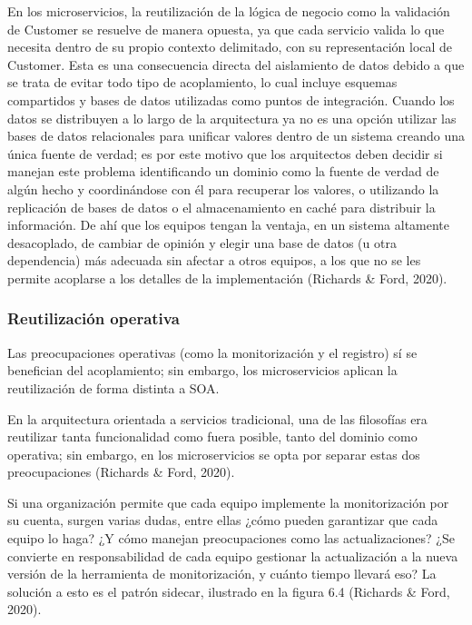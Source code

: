 \documentclass[12pt, a4paper]{article}
\begin{document}
    En los microservicios, la reutilización de la lógica de negocio como la validación de Customer se resuelve de manera opuesta, ya que cada servicio valida lo que necesita dentro de su propio contexto delimitado, con su representación local de Customer. Esta es una consecuencia directa del aislamiento de datos debido a que se trata de evitar todo tipo de acoplamiento, lo cual incluye esquemas compartidos y bases de datos utilizadas como puntos de integración. Cuando los datos se distribuyen a lo largo de la arquitectura ya no es una opción utilizar las bases de datos relacionales para unificar valores dentro de un sistema creando una única fuente de verdad; es por este motivo que los arquitectos deben decidir si manejan este problema identificando un dominio como la fuente de verdad de algún hecho y coordinándose con él para recuperar los valores, o utilizando la replicación de bases de datos o el almacenamiento en caché para distribuir la información. De ahí que los equipos tengan la ventaja, en un sistema altamente desacoplado, de cambiar de opinión y elegir una base de datos (u otra dependencia) más adecuada sin afectar a otros equipos, a los que no se les permite acoplarse a los detalles de la implementación (Richards \& Ford, 2020).

    \subsubsection{Reutilización operativa}

    Las preocupaciones operativas (como la monitorización y el registro) sí se benefician del acoplamiento; sin embargo, los microservicios aplican la reutilización de forma distinta a SOA.

    En la arquitectura orientada a servicios tradicional, una de las filosofías era reutilizar tanta funcionalidad como fuera posible, tanto del dominio como operativa; sin embargo, en los microservicios se opta por separar estas dos preocupaciones (Richards \& Ford, 2020).

    Si una organización permite que cada equipo implemente la monitorización por su cuenta, surgen varias dudas, entre ellas ¿cómo pueden garantizar que cada equipo lo haga? ¿Y cómo manejan preocupaciones como las actualizaciones? ¿Se convierte en responsabilidad de cada equipo gestionar la actualización a la nueva versión de la herramienta de monitorización, y cuánto tiempo llevará eso? La solución a esto es el patrón sidecar, ilustrado en la figura 6.4 (Richards \& Ford, 2020).
\end{document}

